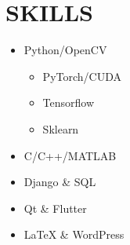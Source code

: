 \documentclass[11pt,a4paper,sans]{moderncv} %
\begin{document}
	\section{SKILLS}
	
	\begin{cvcolumns}
		{
			\vspace{-2em}
			\begin{multicols}{2}
				\begin{itemize}
					\item Python/OpenCV
					\begin{itemize}
						\item PyTorch/CUDA
                        \item Tensorflow
                        \item Sklearn
					\end{itemize}
					\item C/C++/MATLAB
					\item Django \& SQL
					\item Qt \& Flutter
                     \item LaTeX \& WordPress
				\end{itemize}
			\end{multicols}
		}
		

\end{cvcolumns}
\end{document}
